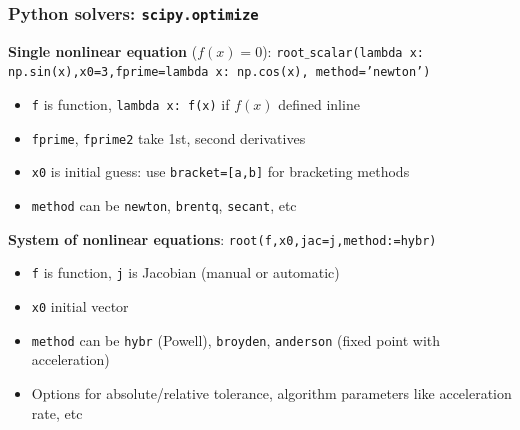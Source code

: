 \documentclass[bigger]{beamer}
\begin{document}
\begin{frame}%

\frametitle{Python solvers: \texttt{scipy.optimize}}

\textbf{Single nonlinear equation} ($f(x)=0$):\newline
\qquad \texttt{root}$\_$\texttt{scalar}\texttt{(lambda x: np.sin(x),x0=3,fprime=lambda x: np.cos(x), method='newton')}

\begin{itemize}

\item \texttt{f} is function, \texttt{lambda x: f(x)} if $f(x)$ defined inline

\item \texttt{fprime}, \texttt{fprime2} take 1st, second derivatives  

\item \texttt{x0} is initial guess: use \texttt{bracket=[a,b]} for bracketing methods

\item \texttt{method} can be \texttt{newton}, \texttt{brentq}, \texttt{secant}, etc 

\end{itemize}


\textbf{System of nonlinear equations}:\newline
\qquad \texttt{root(f,x0,jac=j,method:=hybr)}

\begin{itemize}

\item \texttt{f} is function, \texttt{j} is Jacobian (manual or automatic)
\item \texttt{x0} initial vector
\item \texttt{method} can be \texttt{hybr} (Powell), \texttt{broyden}, \texttt{anderson} (fixed point with acceleration)
\item Options for absolute/relative tolerance, algorithm parameters like acceleration rate, etc

\end{itemize}



\end{frame}%
\end{document}
